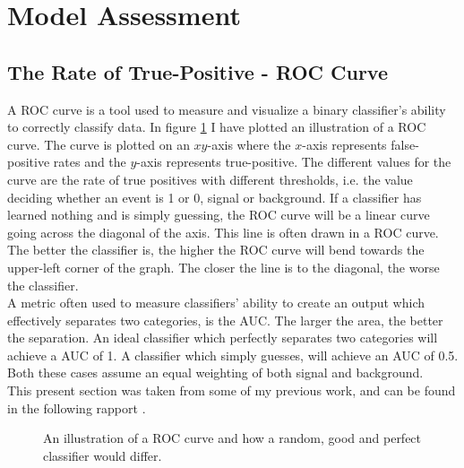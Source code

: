 \newpage
\section{Model Assessment}\label{subsec:Assessment}
\subsection{The Rate of True-Positive - ROC Curve}\label{subsec:AUC}
A \ac{ROC} curve is a tool used to measure and visualize a binary classifier's ability 
to correctly classify data. In figure \ref{fig:ROC} I have plotted an illustration of a 
\ac{ROC} curve. The curve is plotted on an $xy$-axis where the $x$-axis represents 
false-positive rates and the $y$-axis represents true-positive. The different values 
for the curve are the rate of true positives with different thresholds, i.e. 
the value deciding whether an event is 1 or 0, signal or background. If a classifier 
has learned nothing and is simply guessing, the \ac{ROC} curve will be a linear curve 
going across the diagonal of the axis. This line is often drawn in a \ac{ROC} curve. The better the 
classifier is, the higher the \ac{ROC} curve will bend towards the upper-left corner of the 
graph. The closer the line is to the diagonal, the worse the classifier. 
\\
A metric often used to measure classifiers' ability to create an output which effectively 
separates two categories, is the \ac{AUC}. The larger the area, the better the separation. 
An ideal classifier which perfectly separates two categories will achieve a \ac{AUC} of 1.
A classifier which simply guesses, will achieve an \ac{AUC} of 0.5. Both these cases assume 
an equal weighting of both signal and background. 
\\
This present section was taken from some of my previous work, and can be found in the following 
rapport \cite{HirstFretteML}.
\begin{figure}
    \centering
    \caption{An illustration of a \acs{ROC} curve and how a random, good and perfect classifier would differ.}
    \label{fig:ROC}
\end{figure}
